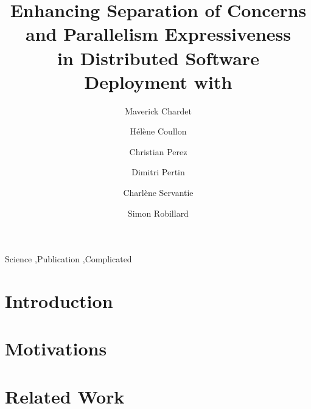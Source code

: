\documentclass[5p]{elsarticle}
\begin{document}
\begin{frontmatter}

  \title{Enhancing Separation of Concerns and Parallelism Expressiveness\\ in
    Distributed Software Deployment with \mad}

  \author[label1]{Maverick Chardet}
  \author[label1]{Hélène Coullon}
  \author[label2]{Christian Perez}
  \author[label1]{Dimitri Pertin}
  \author[label1]{Charlène Servantie}
  \author[label1]{Simon Robillard}

\address[label1]{IMT Atlantique, Inria, LS2N, UBL, F-44307 Nantes, France}
\address[label2]{Univ Lyon, Inria, EnsL, UCBL, CNRS, LIP, Lyon, France}


\begin{abstract}
\end{abstract}

\begin{keyword}
Science \sep Publication \sep Complicated
\end{keyword}

\end{frontmatter}


\section{Introduction}
\label{sec:introduction}


\section{Motivations}
\label{sec:motivation}


\section{Related Work}
\label{sec:related_work}

\end{document}

